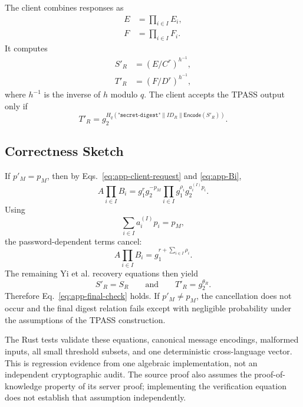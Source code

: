\documentclass[sigconf,anonymous]{acmart}
\newcommand{\Encode}{\mathsf{Encode}}
\begin{document}
The client combines responses as
\begin{align}
E &= \prod_{i\in I}E_i,\label{eq:app-Eagg}\\
F &= \prod_{i\in I}F_i.\label{eq:app-Fagg}
\end{align}
It computes
\begin{align}
S'_R &= \left(E/C^r\right)^{h^{-1}},\label{eq:app-recoverS}\\
T'_R &= \left(F/D^r\right)^{h^{-1}},\label{eq:app-recoverT}
\end{align}
where \(h^{-1}\) is the inverse of \(h\) modulo \(q\). The client accepts the TPASS output only if
\begin{equation}
T'_R
=
g_2^{
H_q(
\texttt{"secret-digest"}
\|ID_R
\|\Encode(S'_R)
)
}.
\label{eq:app-final-check}
\end{equation}

\subsection{Correctness Sketch}

If \(p'_M=p_M\), then by Eqs.~\eqref{eq:app-client-request} and \eqref{eq:app-Bi},
\[
A\prod_{i\in I}B_i
=
g_1^r g_2^{-p_M}
\prod_{i\in I}
g_1^{\rho_i}g_2^{a_i^{(I)}p_i}.
\]
Using
\[
\sum_{i\in I}a_i^{(I)}p_i=p_M,
\]
the password-dependent terms cancel:
\[
A\prod_{i\in I}B_i
=
g_1^{r+\sum_{i\in I}\rho_i}.
\]
The remaining Yi et al. recovery equations then yield
\[
S'_R=S_R
\qquad\text{and}\qquad
T'_R=g_2^{\theta_R}.
\]
Therefore Eq.~\eqref{eq:app-final-check} holds. If \(p'_M\neq p_M\), the cancellation does not occur and the final digest relation fails except with negligible probability under the assumptions of the TPASS construction.

The Rust tests validate these equations, canonical message encodings, malformed
inputs, all small threshold subsets, and one deterministic cross-language
vector. This is regression evidence from one algebraic implementation, not an
independent cryptographic audit. The source proof also assumes the
proof-of-knowledge property of its server proof; implementing the verification
equation does not establish that assumption independently.
\end{document}

